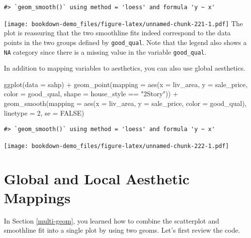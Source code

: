 \documentclass[
]{book}
\newenvironment{Shaded}{\begin{snugshade}}{\end{snugshade}}
\newcommand{\AttributeTok}[1]{\textcolor[rgb]{0.77,0.63,0.00}{#1}}
\newcommand{\ConstantTok}[1]{\textcolor[rgb]{0.00,0.00,0.00}{#1}}
\newcommand{\DecValTok}[1]{\textcolor[rgb]{0.00,0.00,0.81}{#1}}
\newcommand{\FunctionTok}[1]{\textcolor[rgb]{0.00,0.00,0.00}{#1}}
\newcommand{\NormalTok}[1]{#1}
\newcommand{\SpecialCharTok}[1]{\textcolor[rgb]{0.00,0.00,0.00}{#1}}
\newcommand{\StringTok}[1]{\textcolor[rgb]{0.31,0.60,0.02}{#1}}
\begin{document}
\begin{verbatim}
#> `geom_smooth()` using method = 'loess' and formula 'y ~ x'
\end{verbatim}

\texttt{[image: bookdown-demo\_files/figure-latex/unnamed-chunk-221-1.pdf]}
The plot is reassuring that the two smoothline fits indeed correspond to the data points in the two groups defined by \texttt{good\_qual}. Note that the legend also shows a \texttt{NA} category since there is a missing value in the variable \texttt{good\_qual}.

In addition to mapping variables to aesthetics, you can also use global aesthetics.

\begin{Shaded}
\begin{Highlighting}[]
\FunctionTok{ggplot}\NormalTok{(}\AttributeTok{data =}\NormalTok{ sahp) }\SpecialCharTok{+} \FunctionTok{geom\_point}\NormalTok{(}\AttributeTok{mapping =} \FunctionTok{aes}\NormalTok{(}\AttributeTok{x =}\NormalTok{ liv\_area, }\AttributeTok{y =}\NormalTok{ sale\_price, }\AttributeTok{color =}\NormalTok{ good\_qual, }\AttributeTok{shape =}\NormalTok{ house\_style }\SpecialCharTok{==} \StringTok{"2Story"}\NormalTok{)) }\SpecialCharTok{+} \FunctionTok{geom\_smooth}\NormalTok{(}\AttributeTok{mapping =} \FunctionTok{aes}\NormalTok{(}\AttributeTok{x =}\NormalTok{ liv\_area, }\AttributeTok{y =}\NormalTok{ sale\_price, }\AttributeTok{color =}\NormalTok{ good\_qual), }\AttributeTok{linetype =} \DecValTok{2}\NormalTok{, }\AttributeTok{se =} \ConstantTok{FALSE}\NormalTok{)}
\end{Highlighting}
\end{Shaded}

\begin{verbatim}
#> `geom_smooth()` using method = 'loess' and formula 'y ~ x'
\end{verbatim}

\texttt{[image: bookdown-demo\_files/figure-latex/unnamed-chunk-222-1.pdf]}

\hypertarget{global-local-mapping}{%
\section{Global and Local Aesthetic Mappings}\label{global-local-mapping}}

In Section \ref{multi-geom}, you learned how to combine the scatterplot and smoothline fit into a single plot by using two geoms. Let's first review the code.
\end{document}
